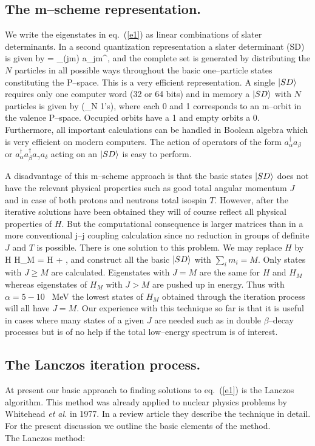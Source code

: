 \subsection{The m--scheme representation.}
%
We write the eigenstates in eq.~(\ref{e1})  as  linear combinations
of slater determinants. In a second quantization representation
a slater determinant (SD) is given by
%
\be
{} = \prod_{(jm)\in {\nu}} a_{jm}^{\dagger},
\ee
%
and the complete set is generated by distributing the $N$ particles
in all possible ways throughout the basic one--particle states constituting
the P--space. This is a very efficient
representation. A single $\left| SD \right\rangle$ requires only one  computer word
(32 or 64 bits) and  in memory a $\left| SD \right\rangle$ with $N$ particles
is given by
%
\be
{} \longrightarrow (\underbrace{00111101010 \cdots}_{N 1's}),
\ee
%
where each 0 and 1 corresponds to an m--orbit in the valence
P--space. Occupied orbits  have a 1 and empty orbits a 0.
 Furthermore, all important calculations  can
be handled in Boolean algebra which is very efficient on modern computers.
The action  of operators of the form $a_{\alpha}^{\dagger} a_{\beta}$ or
$a_{\alpha}^{\dagger} a_{\beta}^{\dagger} a_{\gamma} a_{\delta}$
acting on an $\left| SD \right\rangle$ is easy to perform.

A disadvantage of this m--scheme approach is that the basic states
$\left| SD \right\rangle$ does not have the relevant physical properties such as
good total angular momentum $J$ and in case of both protons and neutrons
total isospin $T$. However, after the iterative solutions have been obtained
they will of course reflect all physical
properties of $H$. But the  computational consequence is larger matrices
than in a more conventional j--j coupling calculation since no reduction
in groups of definite $J$ and $T$ is possible.
There is one solution to this problem. We may replace $H$ by
%
\be
H \longrightarrow H_M = H + \alpha {},
\ee
%
and construct all the basic $\left| SD \right\rangle$ with $\sum_i m_i = M$.
Only states with $ J \geq M$ are calculated. Eigenstates
with $J= M$ are the same for $H$ and $H_M$ whereas eigenstates
of $H_M$ with $J > M$ are pushed up in energy.
Thus with $\alpha = 5 - 10$ ~MeV the lowest states of $H_M$
obtained through the iteration process will all have $J = M$.
Our experience with this technique so far is that it is useful
in cases where many states of a given $J$ are needed such as in double
$\beta$--decay processes but is of no help if the total low--energy
spectrum is of interest.
%
\subsection{The Lanczos iteration process.}
%
At present our basic approach to finding solutions to eq.~(\ref{e1})
is the Lanczos algorithm. This method was already applied to nuclear
physics problems by Whitehead {\sl et al.} in 1977.
In a review article \cite{whit77} they describe the technique in detail.
For the present discussion we outline the basic elements
of the method.\\[2ex]
%
The Lanczos method:

